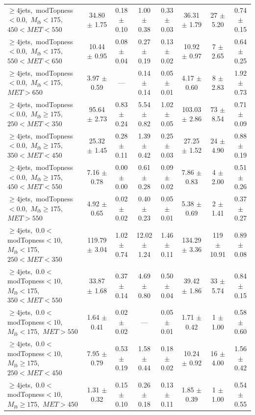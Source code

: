 \begin{table}
{\begin{tabular}{|l|c c c c c|c|c|}
$\ge4$jets,~modTopness$<0.0$,~$M_{lb}<175$,~$450<MET<550$  & 34.80 $\pm$ 1.75  & 0.18 $\pm$ 0.10  & 1.00 $\pm$ 0.38  & 0.33 $\pm$ 0.03  & 36.31 $\pm$ 1.79  & 27 $\pm$ 5.20  & 0.74 $\pm$ 0.15 \\*
$\ge4$jets,~modTopness$<0.0$,~$M_{lb}<175$,~$550<MET<650$  & 10.44 $\pm$ 0.95  & 0.08 $\pm$ 0.04  & 0.27 $\pm$ 0.19  & 0.13 $\pm$ 0.02  & 10.92 $\pm$ 0.97  & 7 $\pm$ 2.65  & 0.64 $\pm$ 0.25 \\*
$\ge4$jets,~modTopness$<0.0$,~$M_{lb}<175$,~$MET>650$  & 3.97 $\pm$ 0.59  & ---  & 0.14 $\pm$ 0.14  & 0.05 $\pm$ 0.01  & 4.17 $\pm$ 0.60  & 8 $\pm$ 2.83  & 1.92 $\pm$ 0.73 \\*
\hline
$\ge4$jets,~modTopness$<0.0$,~$M_{lb}\ge175$,~$250<MET<350$  & 95.64 $\pm$ 2.73  & 0.83 $\pm$ 0.24  & 5.54 $\pm$ 0.82  & 1.02 $\pm$ 0.05  & 103.03 $\pm$ 2.86  & 73 $\pm$ 8.54  & 0.71 $\pm$ 0.09 \\*
$\ge4$jets,~modTopness$<0.0$,~$M_{lb}\ge175$,~$350<MET<450$  & 25.32 $\pm$ 1.45  & 0.28 $\pm$ 0.11  & 1.39 $\pm$ 0.42  & 0.25 $\pm$ 0.03  & 27.25 $\pm$ 1.52  & 24 $\pm$ 4.90  & 0.88 $\pm$ 0.19 \\*
$\ge4$jets,~modTopness$<0.0$,~$M_{lb}\ge175$,~$450<MET<550$  & 7.16 $\pm$ 0.78  & 0.00 $\pm$ 0.00  & 0.61 $\pm$ 0.28  & 0.09 $\pm$ 0.02  & 7.86 $\pm$ 0.83  & 4 $\pm$ 2.00  & 0.51 $\pm$ 0.26 \\*
$\ge4$jets,~modTopness$<0.0$,~$M_{lb}\ge175$,~$MET>550$  & 4.92 $\pm$ 0.65  & 0.02 $\pm$ 0.02  & 0.40 $\pm$ 0.23  & 0.05 $\pm$ 0.01  & 5.38 $\pm$ 0.69  & 2 $\pm$ 1.41  & 0.37 $\pm$ 0.27 \\*
\hline
$\ge4$jets,~$0.0<$modTopness$<10$,~$M_{lb}<175$,~$250<MET<350$  & 119.79 $\pm$ 3.04  & 1.02 $\pm$ 0.74  & 12.02 $\pm$ 1.24  & 1.46 $\pm$ 0.11  & 134.29 $\pm$ 3.36  & 119 $\pm$ 10.91  & 0.89 $\pm$ 0.08 \\*
$\ge4$jets,~$0.0<$modTopness$<10$,~$M_{lb}<175$,~$350<MET<550$  & 33.87 $\pm$ 1.68  & 0.37 $\pm$ 0.14  & 4.69 $\pm$ 0.80  & 0.50 $\pm$ 0.04  & 39.42 $\pm$ 1.86  & 33 $\pm$ 5.74  & 0.84 $\pm$ 0.15 \\*
$\ge4$jets,~$0.0<$modTopness$<10$,~$M_{lb}<175$,~$MET>550$  & 1.64 $\pm$ 0.41  & 0.02 $\pm$ 0.02  & ---  & 0.05 $\pm$ 0.01  & 1.71 $\pm$ 0.42  & 1 $\pm$ 1.00  & 0.58 $\pm$ 0.60 \\*
\hline
$\ge4$jets,~$0.0<$modTopness$<10$,~$M_{lb}\ge175$,~$250<MET<450$  & 7.95 $\pm$ 0.79  & 0.53 $\pm$ 0.19  & 1.58 $\pm$ 0.44  & 0.18 $\pm$ 0.02  & 10.24 $\pm$ 0.92  & 16 $\pm$ 4.00  & 1.56 $\pm$ 0.42 \\*
$\ge4$jets,~$0.0<$modTopness$<10$,~$M_{lb}\ge175$,~$MET>450$  & 1.31 $\pm$ 0.32  & 0.15 $\pm$ 0.10  & 0.26 $\pm$ 0.18  & 0.13 $\pm$ 0.11  & 1.85 $\pm$ 0.39  & 1 $\pm$ 1.00  & 0.54 $\pm$ 0.55 \\*

\end{tabular}}
\end{table}
